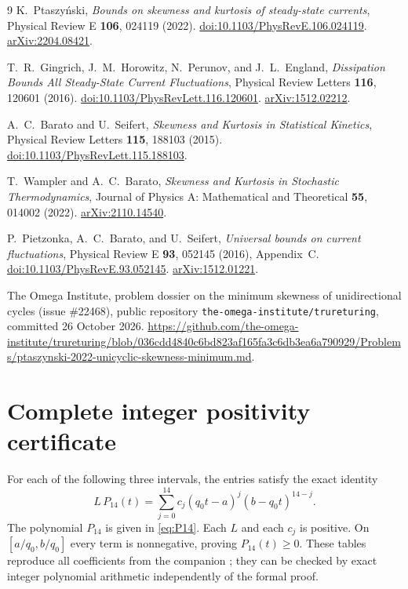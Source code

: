 \documentclass[11pt,a4paper]{article}
\numberwithin{equation}{section}
\theoremstyle{remark}
\newcommand{\Lean}[1]{\texttt{\detokenize{#1}}}
\begin{document}
\clearpage
\begin{thebibliography}{9}
K.~Ptaszy\'nski,
\emph{Bounds on skewness and kurtosis of steady-state currents},
Physical Review E \textbf{106}, 024119 (2022).
\href{https://doi.org/10.1103/PhysRevE.106.024119}{doi:10.1103/PhysRevE.106.024119}.
\href{https://arxiv.org/abs/2204.08421}{arXiv:2204.08421}.

T.~R.~Gingrich, J.~M.~Horowitz, N.~Perunov, and J.~L.~England,
\emph{Dissipation Bounds All Steady-State Current Fluctuations},
Physical Review Letters \textbf{116}, 120601 (2016).
\href{https://doi.org/10.1103/PhysRevLett.116.120601}{doi:10.1103/PhysRevLett.116.120601}.
\href{https://arxiv.org/abs/1512.02212}{arXiv:1512.02212}.

A.~C.~Barato and U.~Seifert,
\emph{Skewness and Kurtosis in Statistical Kinetics},
Physical Review Letters \textbf{115}, 188103 (2015).
\href{https://doi.org/10.1103/PhysRevLett.115.188103}{doi:10.1103/PhysRevLett.115.188103}.

T.~Wampler and A.~C.~Barato,
\emph{Skewness and Kurtosis in Stochastic Thermodynamics},
Journal of Physics A: Mathematical and Theoretical \textbf{55}, 014002 (2022).
\href{https://arxiv.org/abs/2110.14540}{arXiv:2110.14540}.

P.~Pietzonka, A.~C.~Barato, and U.~Seifert,
\emph{Universal bounds on current fluctuations},
Physical Review E \textbf{93}, 052145 (2016), Appendix~C.
\href{https://doi.org/10.1103/PhysRevE.93.052145}{doi:10.1103/PhysRevE.93.052145}.
\href{https://arxiv.org/abs/1512.01221}{arXiv:1512.01221}.

The Omega Institute,
problem dossier on the minimum skewness of unidirectional cycles (issue
\#22468), public repository \nolinkurl{the-omega-institute/trureturing},
committed 26 October 2026.
\url{https://github.com/the-omega-institute/trureturing/blob/036cdd4840c6bd823af165fa3c6db3ea6a790929/Problems/ptaszynski-2022-unicyclic-skewness-minimum.md}.
\end{thebibliography}

\appendix
\clearpage
\section{Complete integer positivity certificate}\label{app:certificate}
For each of the following three intervals, the entries satisfy the exact
identity
\[
 L\,P_{14}(t)=\sum_{j=0}^{14}c_j(q_0t-a)^j(b-q_0t)^{14-j}.
\]
The polynomial $P_{14}$ is given in \eqref{eq:P14}. Each $L$ and each $c_j$
is positive. On $[a/q_0,b/q_0]$ every term is nonnegative, proving
$P_{14}(t)\ge0$. These tables reproduce all coefficients from the companion
\Lean{certificate.json}; they can be checked by exact integer
polynomial arithmetic independently of the formal proof.

\end{document}
